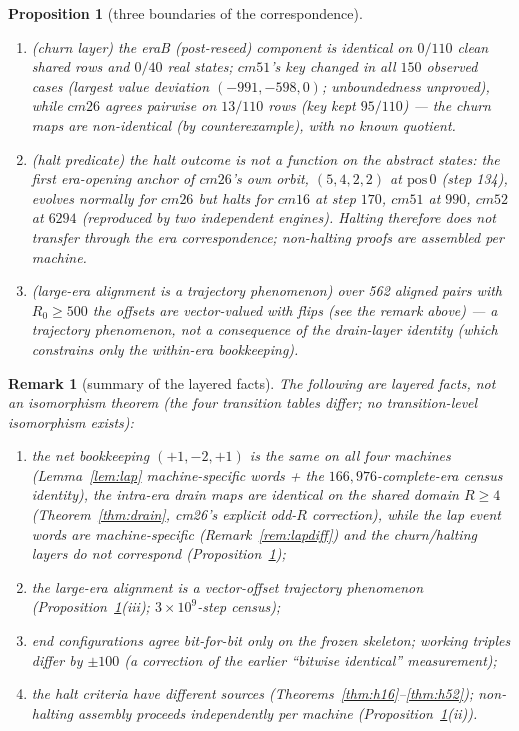\documentclass[11pt]{amsart}
\newtheorem{proposition}[theorem]{Proposition}
\newtheorem{remark}[theorem]{Remark}
\begin{document}
\begin{proposition}[three boundaries of the correspondence]\label{prop:boundary}
\begin{enumerate}
\item (churn layer) the eraB (post-reseed) component is identical on $0/110$ clean shared rows and $0/40$ real states; $cm51$'s key changed in all $150$ observed cases (largest value deviation $(-991,-598,0)$; unboundedness unproved), while $cm26$ agrees pairwise on $13/110$ rows (key kept $95/110$) --- the churn maps are non-identical (by counterexample), with no known quotient.
\item (halt predicate) the halt outcome is not a function on the abstract states: the first era-opening anchor of $cm26$'s own orbit, $(5,4,2,2)$ at $\mathrm{pos}\,0$ (step 134), evolves normally for $cm26$ but halts for $cm16$ at step $170$, $cm51$ at $990$, $cm52$ at $6294$ (reproduced by two independent engines). Halting therefore does not transfer through the era correspondence; non-halting proofs are assembled per machine.
\item (large-era alignment is a trajectory phenomenon) over 562 aligned pairs with $R_0\ge500$ the offsets are vector-valued with flips (see the remark above) --- a trajectory phenomenon, not a consequence of the drain-layer identity (which constrains only the within-era bookkeeping).
\end{enumerate}
\end{proposition}

\begin{remark}[summary of the layered facts]
The following are layered facts, not an isomorphism theorem (the four transition tables differ; no transition-level isomorphism exists):
\begin{enumerate}
\item the net bookkeeping $(+1,-2,+1)$ is the same on all four machines (Lemma~\ref{lem:lap} machine-specific words + the $166{,}976$-complete-era census identity), the intra-era drain maps are identical on the shared domain $R\ge4$ (Theorem~\ref{thm:drain}, cm26's explicit odd-$R$ correction), while the lap event words are machine-specific (Remark~\ref{rem:lapdiff}) and the churn/halting layers do not correspond (Proposition~\ref{prop:boundary});
\item the large-era alignment is a vector-offset trajectory phenomenon (Proposition~\ref{prop:boundary}(iii); $3\times10^9$-step census);
\item end configurations agree bit-for-bit only on the frozen skeleton; working triples differ by $\pm100$ (a correction of the earlier ``bitwise identical'' measurement);
\item the halt criteria have different sources (Theorems~\ref{thm:h16}--\ref{thm:h52}); non-halting assembly proceeds independently per machine (Proposition~\ref{prop:boundary}(ii)).
\end{enumerate}
\end{remark}
\end{document}
